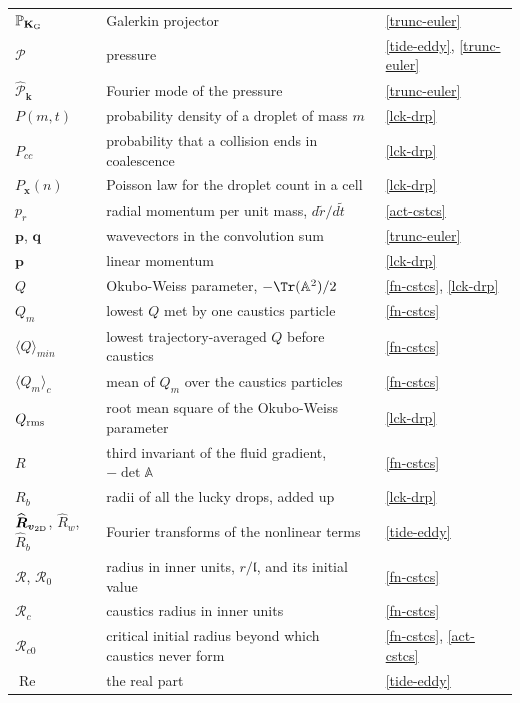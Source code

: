 \begin{longtable}{@{}p{}p{}p{}@{}}
$\mathbb{P}_{\mathbf{K}_{\rm G}}$ & Galerkin projector & \ref{trunc-euler} \\
$\mathcal{P}$ & pressure & \ref{tide-eddy}, \ref{trunc-euler} \\
$\widehat{\mathcal{P}}_{\mathbf{k}}$ & Fourier mode of the pressure & \ref{trunc-euler} \\
$P(m,t)$ & probability density of a droplet of mass $m$ & \ref{lck-drp} \\
$P_{cc}$ & probability that a collision ends in coalescence & \ref{lck-drp} \\
$P_{\boldsymbol{x}}(n)$ & Poisson law for the droplet count in a cell & \ref{lck-drp} \\
$p_r$ & radial momentum per unit mass, $d\tilde{r}/d\tilde{t}$ & \ref{act-cstcs} \\
$\mathbf{p}$, $\mathbf{q}$ & wavevectors in the convolution sum & \ref{trunc-euler} \\
$\boldsymbol{p}$ & linear momentum & \ref{lck-drp} \\
\addlinespace
$Q$ & Okubo-Weiss parameter, $-\Tr(\mathbb{A}^2)/2$ & \ref{fn-cstcs}, \ref{lck-drp} \\
$Q_m$ & lowest $Q$ met by one caustics particle & \ref{fn-cstcs} \\
$\langle Q\rangle_{min}$ & lowest trajectory-averaged $Q$ before caustics & \ref{fn-cstcs} \\
$\langle Q_m\rangle_c$ & mean of $Q_m$ over the caustics particles & \ref{fn-cstcs} \\
$Q_{\rm rms}$ & root mean square of the Okubo-Weiss parameter & \ref{lck-drp} \\
\addlinespace
$R$ & third invariant of the fluid gradient, $-\det\mathbb{A}$ & \ref{fn-cstcs} \\
$R_b$ & radii of all the lucky drops, added up & \ref{lck-drp} \\
$\widehat{\boldsymbol{R}}_{\boldsymbol{v}_{\rm 2D}}$, $\widehat{R}_w$, $\widehat{R}_b$ & Fourier transforms of the nonlinear terms & \ref{tide-eddy} \\
$\mathcal{R}$, $\mathcal{R}_0$ & radius in inner units, $r/\mathfrak{l}$, and its initial value & \ref{fn-cstcs} \\
$\mathcal{R}_c$ & caustics radius in inner units & \ref{fn-cstcs} \\
$\mathcal{R}_{c0}$ & critical initial radius beyond which caustics never form & \ref{fn-cstcs}, \ref{act-cstcs} \\
$\operatorname{Re}$ & the real part & \ref{tide-eddy} \\

\end{longtable}
